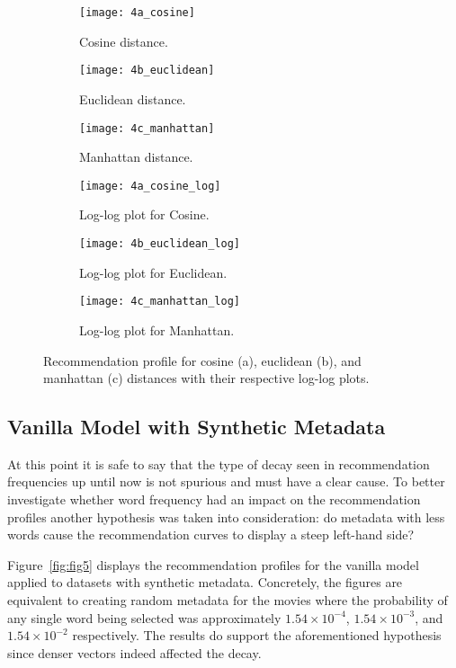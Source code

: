 \begin{figure}
  \centering
  \begin{subfigure}{0.3\textwidth}
    \centering
    \texttt{[image: 4a\_cosine]}
    \caption{Cosine distance.\label{fig:fig4a}}
  \end{subfigure}
  \begin{subfigure}{0.3\textwidth}
    \centering
    \texttt{[image: 4b\_euclidean]}
    \caption{Euclidean distance.\label{fig:fig4b}}
  \end{subfigure}
  \begin{subfigure}{0.3\textwidth}
    \centering
    \texttt{[image: 4c\_manhattan]}
    \caption{Manhattan distance.\label{fig:fig4c}}
  \end{subfigure}
  \begin{subfigure}{0.3\textwidth}
    \centering
    \texttt{[image: 4a\_cosine\_log]}
    \caption{Log-log plot for Cosine.\label{fig:fig4a}}
  \end{subfigure}
  \begin{subfigure}{0.3\textwidth}
    \centering
    \texttt{[image: 4b\_euclidean\_log]}
    \caption{Log-log plot for Euclidean.\label{fig:fig4b}}
  \end{subfigure}
  \begin{subfigure}{0.3\textwidth}
    \centering
    \texttt{[image: 4c\_manhattan\_log]}
    \caption{Log-log plot for Manhattan.\label{fig:fig4c}}
  \end{subfigure}
  \caption{Recommendation profile for cosine (a), euclidean (b), and manhattan
    (c) distances with their respective log-log plots.\label{fig:fig4}}
\end{figure}

\subsection{Vanilla Model with Synthetic Metadata}
\label{subsec:synthetic}

At this point it is safe to say that the type of decay seen in recommendation
frequencies up until now is not spurious and must have a clear cause. To better
investigate whether word frequency had an impact on the recommendation profiles
another hypothesis was taken into consideration: do metadata with less words
cause the recommendation curves to display a steep left-hand side?

Figure~\ref{fig:fig5} displays the recommendation profiles for the vanilla model
applied to datasets with synthetic metadata. Concretely, the figures are
equivalent to creating random metadata for the movies where the probability of
any single word being selected was approximately $1.54 \times 10^{-4}$, $1.54
\times 10^{-3}$, and $1.54 \times 10^{-2}$ respectively. The results do support
the aforementioned hypothesis since denser vectors indeed affected the decay.

